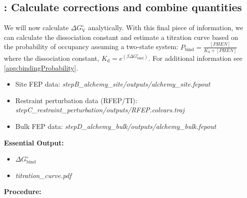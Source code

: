\documentclass[9pt,tutorial]{Styling/livecoms}
\newcommand{\filepath}[1]{\textit{#1}}
\begin{document}
\subsection{\hspace{-1em}: Calculate corrections and combine quantities}\label{step:combinequantities}
    \begin{tcolorbox}[colback=blue!5!white,colframe=blue!75!black]
    We will now calculate $\Delta G^\circ_\mathrm{V}$ analytically. With this final piece of information, we can calculate the dissociation constant and estimate a titration curve based on the probability of occupancy assuming a two-state system: $P_\mathrm{bind}=\frac{[PHEN]}{K_\mathrm{d}+[PHEN]}$ where the dissociation constant, ${K_\mathrm{d}}=e^{\left(\beta \Delta G^\circ_\mathrm{bind}\right)}$. For additional information see \ref{app:bindingProbability}.
    \end{tcolorbox}
    \begin{itemize}
        \item Site FEP data: \filepath{stepB\_alchemy\_site/outputs/alchemy\_site.fepout} 
        \item Restraint perturbation data (RFEP/TI): \filepath{stepC\_restraint\_perturbation/outputs/RFEP.colvars.traj}
        \item Bulk FEP data: \filepath{stepD\_alchemy\_bulk/outputs/alchemy\_bulk.fepout}
    \end{itemize}
    \textbf{Essential Output:}
    \begin{itemize}
        \item $\Delta G^\circ_{\mathrm{bind}}$
        \item \filepath{titration\_curve.pdf}
    \end{itemize}
    \textbf{Procedure:}
\end{document}
